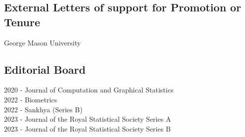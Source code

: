 \documentclass[12pt]{article}
\newcommand{\mylift}[1]{\vspace*{#1}}
\begin{document}
\mylift{-1.5em}

\subsection*{External Letters of support for Promotion or Tenure}
George Mason University

\smallskip

\subsection*{Editorial Board} 
2020 - \quad \quad Journal of Computation and Graphical Statistics\\
2022 - \quad \quad Biometrics \\
2022 - \quad \quad Sankhya (Series B) \\
2023 - \quad \quad Journal of the Royal Statistical Society Series A \\
2023 - \quad \quad Journal of the Royal Statistical Society Series B 
\end{document}
